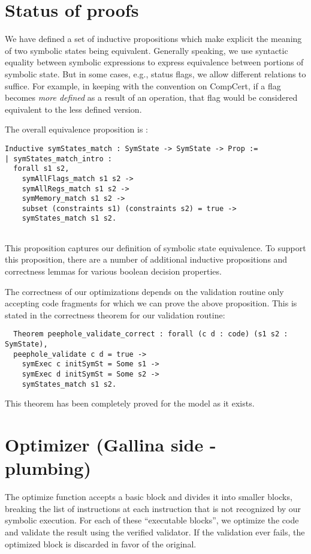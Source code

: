 \documentclass{article}
\begin{document}
\section{Status of proofs}
We have defined a set of inductive propositions which make explicit
the meaning of two symbolic states being equivalent. Generally
speaking, we use syntactic equality between symbolic expressions to
express equivalence between portions of symbolic state. But
in some cases, e.g., status flags, we allow different relations to
suffice. For example, in keeping with the convention on CompCert, if a
flag becomes {\it more defined} as a result of an operation, that flag
would be considered equivalent to the less defined version. 

The overall equivalence proposition is :

\begin{verbatim}
Inductive symStates_match : SymState -> SymState -> Prop :=
| symStates_match_intro : 
  forall s1 s2, 
    symAllFlags_match s1 s2 ->
    symAllRegs_match s1 s2 ->
    symMemory_match s1 s2 ->
    subset (constraints s1) (constraints s2) = true ->
    symStates_match s1 s2. 
  
\end{verbatim}

This proposition captures our definition of symbolic state
equivalence. To support this proposition, there are a number of
additional inductive propositions and correctness lemmas for various
boolean decision properties. 

The correctness of our optimizations depends on the validation routine
only accepting code fragments for which we can prove the above
proposition. This is stated in  the correctness theorem for our
validation routine:

\begin{verbatim}
  Theorem peephole_validate_correct : forall (c d : code) (s1 s2 : SymState),
  peephole_validate c d = true -> 
    symExec c initSymSt = Some s1 -> 
    symExec d initSymSt = Some s2 ->
    symStates_match s1 s2.
\end{verbatim}

This theorem has been completely proved for the model as it
exists.

\section{Optimizer (Gallina side - plumbing)}
The optimize function accepts a basic block and divides it into
smaller blocks, breaking the list of instructions at each instruction
that is not recognized by our symbolic execution.  For each of these
``executable blocks'', we optimize the code and validate the result
using the verified validator.  If the validation ever fails, the
optimized block is discarded in favor of the original.
\end{document}
